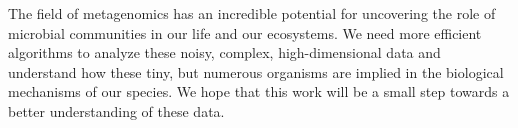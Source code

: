 The field of metagenomics has an incredible potential for uncovering the role of microbial communities in our life and our ecosystems. We need more efficient algorithms to analyze these noisy, complex, high-dimensional data and understand how these tiny, but numerous organisms are implied in the biological mechanisms of our species. We hope that this work will be a small step towards a better understanding of these data.
